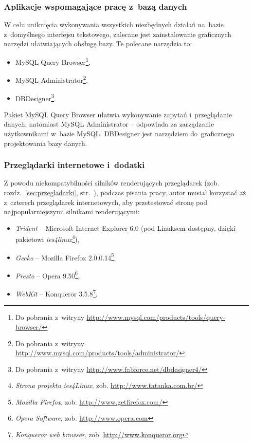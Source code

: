 \documentclass[a4paper,12pt,oneside]{report}
\begin{document}
\subsubsection{Aplikacje wspomagające pracę z~bazą danych}
\label{subsub:querybrowser}
W celu uniknięcia wykonywania wszystkich niezbędnych działań na~bazie z~domyślnego interfejsu tekstowego, zalecane jest zainstalowanie graficznych narzędzi ułatwiających obsługę bazy. Te polecane narzędzia to:
\begin{itemize}
  \item MySQL Query Browser\footnote{Do pobrania z~witryny \url{http://www.mysql.com/products/tools/query-browser/}},
  \item MySQL Administrator\footnote{Do pobrania z~witryny \url{http://www.mysql.com/products/tools/administrator/}},
  \item DBDesigner\footnote{Do pobrania z~witryny \url{http://www.fabforce.net/dbdesigner4/}}.
\end{itemize}
Pakiet MySQL Query Browser ułatwia wykonywanie zapytań i~przeglądanie danych, natomiast MySQL Administrator -- odpowiada za zarządzanie użytkownikami w~bazie MySQL. DBDesigner jest narzędziem do~graficznego projektowania bazy danych.

\subsubsection{Przeglądarki internetowe i~dodatki}
\label{subsub:browser}
Z powodu niekompatybilności silników renderujących przeglądarek (zob. rozdz.~\ref{sec:przegladarki}, str.~\pageref{sec:przegladarki}), podczas pisania pracy, autor musiał korzystać aż z~czterech przeglądarek internetowych, aby przetestować stronę pod najpopularniejszymi silnikami renderującymi:
\begin{itemize}
  \item \emph{Trident} -- Microsoft Internet Explorer 6.0 (pod Linuksem dostępny, dzięki pakietowi \emph{ies4linux}\footnote{\emph{Strona projektu ies4Linux}, zob. \url{http://www.tatanka.com.br/}}),
  \item \emph{Gecko} -- Mozilla Firefox 2.0.0.14\footnote{\emph{Mozilla Firefox}, zob. \url{http://www.getfirefox.com/}},
  \item \emph{Presto} -- Opera 9.50\footnote{\emph{Opera Software}, zob. \url{http://www.opera.com}},
  \item \emph{WebKit} -- Konqueror 3.5.8\footnote{\emph{Konqueror web browser}, zob. \url{http://www.konqueror.org}}.
\end{itemize}
\end{document}
